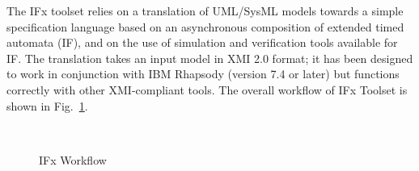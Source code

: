 \documentclass[a4paper,twoside]{article}
\begin{document}
The IFx toolset relies on a translation of UML/SysML models towards a simple specification language based on an asynchronous composition of extended timed automata (IF), and on the use of simulation and verification tools available for IF. The translation takes an input model in XMI 2.0 format; it has been designed to work in conjunction with IBM Rhapsody (version 7.4 or later) but functions correctly with other XMI-compliant tools. The overall workflow  of IFx Toolset is shown in Fig.~\ref{fig:flow}.


\begin{figure}[!h]
  \vspace{8cm}~
  \centering
  \caption{IFx Workflow}
  \label{fig:flow}
 \end{figure}


{\small
}

%

\vfill
\end{document}
